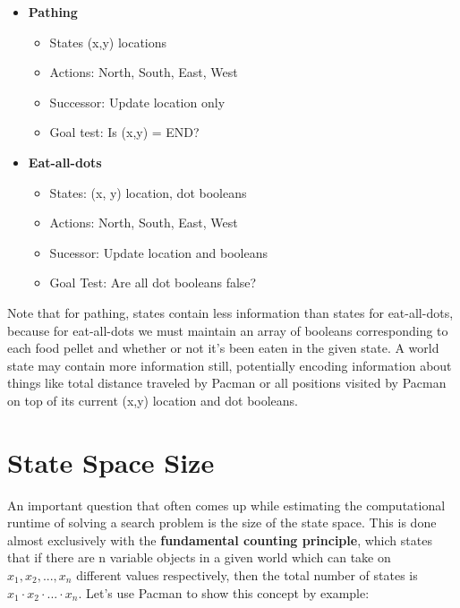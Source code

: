 \documentclass{article}[letterpaper]
\begin{document}
\begin{minipage}{0.5\textwidth}
\begin{itemize}
\item \textbf{Pathing}
\begin{itemize}
\item States (x,y) locations
\item Actions: North, South, East, West
\item Successor: Update location only
\item Goal test: Is (x,y) = END?
\end{itemize}
\end{itemize}
\end{minipage}
\begin{minipage}{0.5\textwidth}
\begin{itemize}
\item \textbf{Eat-all-dots} 
\begin{itemize}
\item States: (x, y) location, dot booleans
\item Actions: North, South, East, West
\item Sucessor: Update location and booleans
\item Goal Test: Are all dot booleans false?
\end{itemize}
\end{itemize}
\end{minipage}

Note that for pathing, states contain less information than states for eat-all-dots, because for eat-all-dots we must maintain an array of booleans corresponding to each food pellet and whether or not it’s been eaten in the given state. A world state may contain more information still, potentially encoding information about things like total distance traveled by Pacman or all positions visited by Pacman on top of its current (x,y) location and dot booleans.


\section*{State Space Size}
An important question that often comes up while estimating the computational runtime of solving a search problem is the size of the state space. This is done almost exclusively with the \textbf{fundamental counting principle}, which states that if there are n variable objects in a given world which can take on 
$x_1, x_2, ..., x_n$ different values respectively, then the total number of states is $x_1\cdot x_2 \cdot ... \cdot x_n$. Let’s use Pacman to show this concept by example:
\end{document}
